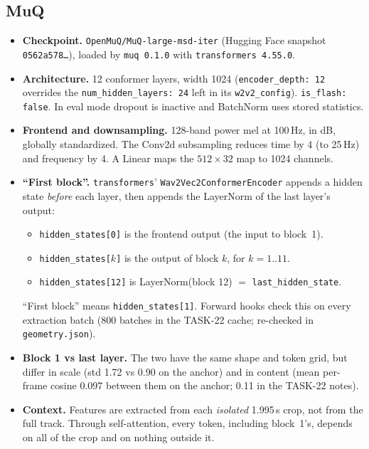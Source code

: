 \documentclass[10pt,letterpaper]{article}
\newcommand{\src}[1]{\nolinkurl{#1}}
\begin{document}
\subsection{MuQ}
\begin{itemize}
\item \textbf{Checkpoint.} \texttt{OpenMuQ/MuQ-large-msd-iter} (Hugging Face snapshot \texttt{0562a578\ldots}), loaded by \texttt{muq 0.1.0} with \texttt{transformers 4.55.0}.
\item \textbf{Architecture.} 12 conformer layers, width 1024 (\texttt{encoder\_depth: 12} overrides the \texttt{num\_hidden\_layers: 24} left in its \texttt{w2v2\_config}). \texttt{is\_flash: false}. In eval mode dropout is inactive and BatchNorm uses stored statistics.
\item \textbf{Frontend and downsampling.} 128-band power mel at 100\,Hz, in dB, globally standardized. The Conv2d subsampling reduces time by 4 (to 25\,Hz) and frequency by 4. A Linear maps the $512\times32$ map to 1024 channels.
\item \textbf{``First block''.} \texttt{transformers}' \texttt{Wav2Vec2ConformerEncoder} appends a hidden state \emph{before} each layer, then appends the LayerNorm of the last layer's output:
  \begin{itemize}
  \item \texttt{hidden\_states[0]} is the frontend output (the input to block~1).
  \item \texttt{hidden\_states[$k$]} is the output of block $k$, for $k=1..11$.
  \item \texttt{hidden\_states[12]} is LayerNorm(block 12) $=$ \texttt{last\_hidden\_state}.
  \end{itemize}
  ``First block'' means \texttt{hidden\_states[1]}. Forward hooks check this on every extraction batch (800 batches in the TASK-22 cache; re-checked in \src{geometry.json}).
\item \textbf{Block 1 vs last layer.} The two have the same shape and token grid, but differ in scale (std 1.72 vs 0.90 on the anchor) and in content (mean per-frame cosine 0.097 between them on the anchor; 0.11 in the TASK-22 notes).
\item \textbf{Context.} Features are extracted from each \emph{isolated} 1.995\,s crop, not from the full track. Through self-attention, every token, including block~1's, depends on all of the crop and on nothing outside it.
\end{itemize}
\end{document}
